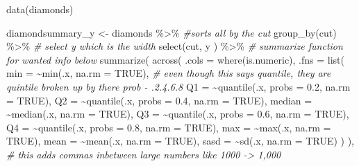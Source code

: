 \documentclass[
]{article}
\newenvironment{Shaded}{\begin{snugshade}}{\end{snugshade}}
\newcommand{\AttributeTok}[1]{\textcolor[rgb]{0.77,0.63,0.00}{#1}}
\newcommand{\CommentTok}[1]{\textcolor[rgb]{0.56,0.35,0.01}{\textit{#1}}}
\newcommand{\ConstantTok}[1]{\textcolor[rgb]{0.00,0.00,0.00}{#1}}
\newcommand{\FloatTok}[1]{\textcolor[rgb]{0.00,0.00,0.81}{#1}}
\newcommand{\FunctionTok}[1]{\textcolor[rgb]{0.00,0.00,0.00}{#1}}
\newcommand{\NormalTok}[1]{#1}
\newcommand{\OtherTok}[1]{\textcolor[rgb]{0.56,0.35,0.01}{#1}}
\newcommand{\SpecialCharTok}[1]{\textcolor[rgb]{0.00,0.00,0.00}{#1}}
\begin{document}
\begin{Shaded}
\begin{Highlighting}[]
\FunctionTok{data}\NormalTok{(diamonds)}

\NormalTok{diamondsummary\_y }\OtherTok{\textless{}{-}}\NormalTok{ diamonds }\SpecialCharTok{\%\textgreater{}\%}
  \CommentTok{\#sorts all by the cut}
  \FunctionTok{group\_by}\NormalTok{(cut) }\SpecialCharTok{\%\textgreater{}\%}
  \CommentTok{\# select y which is the width }
  \FunctionTok{select}\NormalTok{(cut, y ) }\SpecialCharTok{\%\textgreater{}\%}
  \CommentTok{\# summarize function for wanted info below}
  \FunctionTok{summarize}\NormalTok{(}
    \FunctionTok{across}\NormalTok{(}
      \AttributeTok{.cols =} \FunctionTok{where}\NormalTok{(is.numeric),}
      \AttributeTok{.fns =} \FunctionTok{list}\NormalTok{(}
        \AttributeTok{min =} \SpecialCharTok{\textasciitilde{}}\FunctionTok{min}\NormalTok{(.x, }\AttributeTok{na.rm =} \ConstantTok{TRUE}\NormalTok{),}
        \CommentTok{\# even though this says quantile, they are quintile broken up by there prob {-} .2.4.6.8}
        \AttributeTok{Q1 =} \SpecialCharTok{\textasciitilde{}}\FunctionTok{quantile}\NormalTok{(.x, }\AttributeTok{probs =} \FloatTok{0.2}\NormalTok{, }\AttributeTok{na.rm =} \ConstantTok{TRUE}\NormalTok{),}
        \AttributeTok{Q2 =} \SpecialCharTok{\textasciitilde{}}\FunctionTok{quantile}\NormalTok{(.x, }\AttributeTok{probs =} \FloatTok{0.4}\NormalTok{, }\AttributeTok{na.rm =} \ConstantTok{TRUE}\NormalTok{),}
        \AttributeTok{median =} \SpecialCharTok{\textasciitilde{}}\FunctionTok{median}\NormalTok{(.x, }\AttributeTok{na.rm =} \ConstantTok{TRUE}\NormalTok{),}
        \AttributeTok{Q3 =} \SpecialCharTok{\textasciitilde{}}\FunctionTok{quantile}\NormalTok{(.x, }\AttributeTok{probs =} \FloatTok{0.6}\NormalTok{, }\AttributeTok{na.rm =} \ConstantTok{TRUE}\NormalTok{),}
        \AttributeTok{Q4 =} \SpecialCharTok{\textasciitilde{}}\FunctionTok{quantile}\NormalTok{(.x, }\AttributeTok{probs =} \FloatTok{0.8}\NormalTok{, }\AttributeTok{na.rm =} \ConstantTok{TRUE}\NormalTok{),}
        \AttributeTok{max =} \SpecialCharTok{\textasciitilde{}}\FunctionTok{max}\NormalTok{(.x, }\AttributeTok{na.rm =} \ConstantTok{TRUE}\NormalTok{),}
        \AttributeTok{mean =} \SpecialCharTok{\textasciitilde{}}\FunctionTok{mean}\NormalTok{(.x, }\AttributeTok{na.rm =} \ConstantTok{TRUE}\NormalTok{),}
        \AttributeTok{sasd =} \SpecialCharTok{\textasciitilde{}}\FunctionTok{sd}\NormalTok{(.x, }\AttributeTok{na.rm =} \ConstantTok{TRUE}\NormalTok{)}
\NormalTok{      )}
\NormalTok{    ),}
    \CommentTok{\# this adds commas inbetween large numbers like 1000 {-}\textgreater{} 1,000}

\end{Highlighting}
\end{Shaded}
\end{document}
